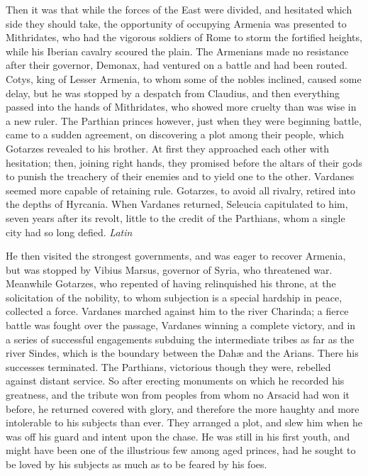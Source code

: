 
Then it was that while the forces of the East were divided, and hesitated which side they should take, the opportunity of occupying Armenia was presented to Mithridates, who had the vigorous soldiers of Rome to storm the fortified heights, while his Iberian cavalry scoured the plain. The Armenians made no resistance after their governor, Demonax, had ventured on a battle and had been routed. Cotys, king of Lesser Armenia, to whom some of the nobles inclined, caused some delay, but he was stopped by a despatch from Claudius, and then everything passed into the hands of Mithridates, who showed more cruelty than was wise in a new ruler. The Parthian princes however, just when they were beginning battle, came to a sudden agreement, on discovering a plot among their people, which Gotarzes revealed to his brother. At first they approached each other with hesitation; then, joining right hands, they promised before the altars of their gods to punish the treachery of their enemies and to yield one to the other. Vardanes seemed more capable of retaining rule. Gotarzes, to avoid all rivalry, retired into the depths of Hyrcania. When Vardanes returned, Seleucia capitulated to him, seven years after its revolt, little to the credit of the Parthians, whom a single city had so long defied. \emph{Latin}


He then visited the strongest governments, and was eager to recover Armenia, but was stopped by Vibius Marsus, governor of Syria, who threatened war. Meanwhile Gotarzes, who repented of having relinquished his throne, at the solicitation of the nobility, to whom subjection is a special hardship in peace, collected a force. Vardanes marched against him to the river Charinda; a fierce battle was fought over the passage, Vardanes winning a complete victory, and in a series of successful engagements subduing the intermediate tribes as far as the river Sindes, which is the boundary between the Dahæ and the Arians. There his successes terminated. The Parthians, victorious though they were, rebelled against distant service. So after erecting monuments on which he recorded his greatness, and the tribute won from peoples from whom no Arsacid had won it before, he returned covered with glory, and therefore the more haughty and more intolerable to his subjects than ever. They arranged a plot, and slew him when he was off his guard and intent upon the chase. He was still in his first youth, and might have been one of the illustrious few among aged princes, had he sought to be loved by his subjects as much as to be feared by his foes.

